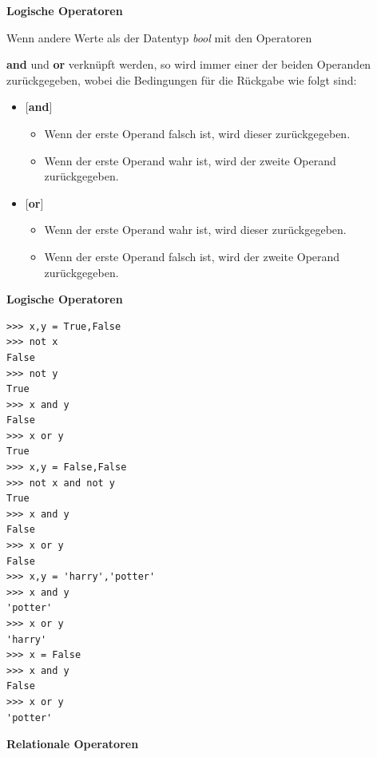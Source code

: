 \par\noindent\textbf{Logische Operatoren}

Wenn andere Werte als der Datentyp \emph{bool} mit den Operatoren
\par\noindent\textbf{and} und \textbf{or} verknüpft werden, so wird immer einer der
beiden Operanden zurückgegeben, wobei die Bedingungen für die Rückgabe
wie folgt sind:

\begin{itemize}
\itemsep1pt\parskip0pt
\item
  {{[}\textbf{and}{]}}

  \begin{itemize}
  \itemsep1pt\parskip0pt
  \item
    {Wenn der erste Operand falsch ist, wird dieser zurückgegeben.}
  \item
    {Wenn der erste Operand wahr ist, wird der zweite Operand
    zurückgegeben.}
  \end{itemize}
\item
  {{[}\textbf{or}{]}}

  \begin{itemize}
  \itemsep1pt\parskip0pt
  \item
    {Wenn der erste Operand wahr ist, wird dieser zurückgegeben.}
  \item
    {Wenn der erste Operand falsch ist, wird der zweite Operand
    zurückgegeben.}
  \end{itemize}
\end{itemize}




\par\noindent\textbf{Logische Operatoren}

\begin{verbatim}
>>> x,y = True,False
>>> not x
False
>>> not y
True
>>> x and y
False
>>> x or y
True
>>> x,y = False,False
>>> not x and not y
True
>>> x and y
False
>>> x or y
False
>>> x,y = 'harry','potter'
>>> x and y
'potter'
>>> x or y
'harry'
>>> x = False
>>> x and y
False
>>> x or y
'potter'
\end{verbatim}




\par\noindent\textbf{Relationale Operatoren}

